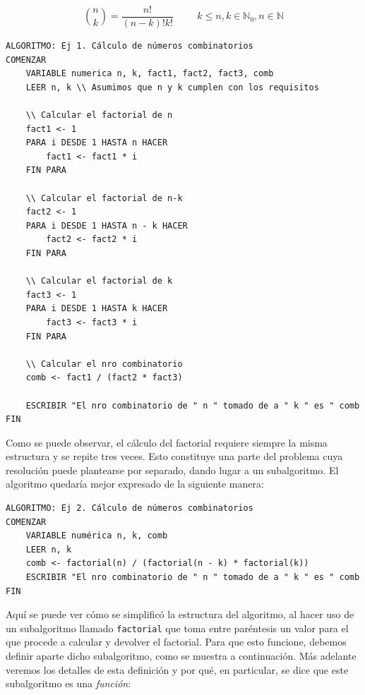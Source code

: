 \documentclass[]{book}
\begin{document}
\[ {n \choose k} = \frac{n!}{(n-k)!k!} \hspace{1cm} k \le n, k \in \mathbb{N}_0, n \in \mathbb{N}\]

\begin{verbatim}
ALGORITMO: Ej 1. Cálculo de números combinatorios
COMENZAR
    VARIABLE numerica n, k, fact1, fact2, fact3, comb
    LEER n, k \\ Asumimos que n y k cumplen con los requisitos

    \\ Calcular el factorial de n
    fact1 <- 1
    PARA i DESDE 1 HASTA n HACER
        fact1 <- fact1 * i
    FIN PARA

    \\ Calcular el factorial de n-k
    fact2 <- 1
    PARA i DESDE 1 HASTA n - k HACER
        fact2 <- fact2 * i
    FIN PARA

    \\ Calcular el factorial de k
    fact3 <- 1
    PARA i DESDE 1 HASTA k HACER
        fact3 <- fact3 * i
    FIN PARA

    \\ Calcular el nro combinatorio
    comb <- fact1 / (fact2 * fact3)

    ESCRIBIR "El nro combinatorio de " n " tomado de a " k " es " comb
FIN
\end{verbatim}

Como se puede observar, el cálculo del factorial requiere siempre la misma estructura y se repite tres veces. Esto constituye una parte del problema cuya resolución puede plantearse por separado, dando lugar a un subalgoritmo. El algoritmo quedaría mejor expresado de la siguiente manera:

\begin{verbatim}
ALGORITMO: Ej 2. Cálculo de números combinatorios
COMENZAR
    VARIABLE numérica n, k, comb
    LEER n, k 
    comb <- factorial(n) / (factorial(n - k) * factorial(k))
    ESCRIBIR "El nro combinatorio de " n " tomado de a " k " es " comb
FIN
\end{verbatim}

Aquí se puede ver cómo se simplificó la estructura del algoritmo, al hacer uso de un subalgoritmo llamado \texttt{factorial} que toma entre paréntesis un valor para el que procede a calcular y devolver el factorial. Para que esto funcione, debemos definir aparte dicho subalgoritmo, como se muestra a continuación. Más adelante veremos los detalles de esta definición y por qué, en particular, se dice que este subalgoritmo es una \emph{función}:
\end{document}

